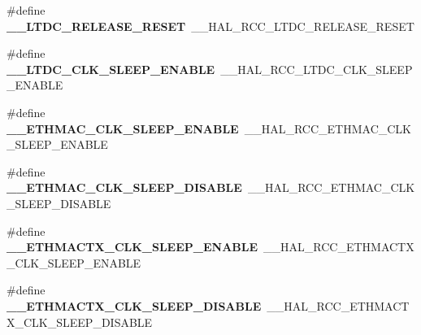 \begin{DoxyCompactItemize}
\item 
\hypertarget{group___h_a_l___r_c_c___aliased_ga481cafca3c88f7c7da318f9a6ab50cdb}{\#define {\bfseries \-\_\-\-\_\-\-L\-T\-D\-C\-\_\-\-R\-E\-L\-E\-A\-S\-E\-\_\-\-R\-E\-S\-E\-T}~\-\_\-\-\_\-\-H\-A\-L\-\_\-\-R\-C\-C\-\_\-\-L\-T\-D\-C\-\_\-\-R\-E\-L\-E\-A\-S\-E\-\_\-\-R\-E\-S\-E\-T}\label{group___h_a_l___r_c_c___aliased_ga481cafca3c88f7c7da318f9a6ab50cdb}

\item 
\hypertarget{group___h_a_l___r_c_c___aliased_ga3f970fe5172ef41349997acb72e5b92c}{\#define {\bfseries \-\_\-\-\_\-\-L\-T\-D\-C\-\_\-\-C\-L\-K\-\_\-\-S\-L\-E\-E\-P\-\_\-\-E\-N\-A\-B\-L\-E}~\-\_\-\-\_\-\-H\-A\-L\-\_\-\-R\-C\-C\-\_\-\-L\-T\-D\-C\-\_\-\-C\-L\-K\-\_\-\-S\-L\-E\-E\-P\-\_\-\-E\-N\-A\-B\-L\-E}\label{group___h_a_l___r_c_c___aliased_ga3f970fe5172ef41349997acb72e5b92c}

\item 
\hypertarget{group___h_a_l___r_c_c___aliased_ga719cdae441aa9421f0714b6359d02375}{\#define {\bfseries \-\_\-\-\_\-\-E\-T\-H\-M\-A\-C\-\_\-\-C\-L\-K\-\_\-\-S\-L\-E\-E\-P\-\_\-\-E\-N\-A\-B\-L\-E}~\-\_\-\-\_\-\-H\-A\-L\-\_\-\-R\-C\-C\-\_\-\-E\-T\-H\-M\-A\-C\-\_\-\-C\-L\-K\-\_\-\-S\-L\-E\-E\-P\-\_\-\-E\-N\-A\-B\-L\-E}\label{group___h_a_l___r_c_c___aliased_ga719cdae441aa9421f0714b6359d02375}

\item 
\hypertarget{group___h_a_l___r_c_c___aliased_gac126a734a698ab6ea80dc14acb166bcc}{\#define {\bfseries \-\_\-\-\_\-\-E\-T\-H\-M\-A\-C\-\_\-\-C\-L\-K\-\_\-\-S\-L\-E\-E\-P\-\_\-\-D\-I\-S\-A\-B\-L\-E}~\-\_\-\-\_\-\-H\-A\-L\-\_\-\-R\-C\-C\-\_\-\-E\-T\-H\-M\-A\-C\-\_\-\-C\-L\-K\-\_\-\-S\-L\-E\-E\-P\-\_\-\-D\-I\-S\-A\-B\-L\-E}\label{group___h_a_l___r_c_c___aliased_gac126a734a698ab6ea80dc14acb166bcc}

\item 
\hypertarget{group___h_a_l___r_c_c___aliased_ga821804d4757084a396a5737683660e0c}{\#define {\bfseries \-\_\-\-\_\-\-E\-T\-H\-M\-A\-C\-T\-X\-\_\-\-C\-L\-K\-\_\-\-S\-L\-E\-E\-P\-\_\-\-E\-N\-A\-B\-L\-E}~\-\_\-\-\_\-\-H\-A\-L\-\_\-\-R\-C\-C\-\_\-\-E\-T\-H\-M\-A\-C\-T\-X\-\_\-\-C\-L\-K\-\_\-\-S\-L\-E\-E\-P\-\_\-\-E\-N\-A\-B\-L\-E}\label{group___h_a_l___r_c_c___aliased_ga821804d4757084a396a5737683660e0c}

\item 
\hypertarget{group___h_a_l___r_c_c___aliased_ga2965f3df04e318e630a14190539ed94f}{\#define {\bfseries \-\_\-\-\_\-\-E\-T\-H\-M\-A\-C\-T\-X\-\_\-\-C\-L\-K\-\_\-\-S\-L\-E\-E\-P\-\_\-\-D\-I\-S\-A\-B\-L\-E}~\-\_\-\-\_\-\-H\-A\-L\-\_\-\-R\-C\-C\-\_\-\-E\-T\-H\-M\-A\-C\-T\-X\-\_\-\-C\-L\-K\-\_\-\-S\-L\-E\-E\-P\-\_\-\-D\-I\-S\-A\-B\-L\-E}\label{group___h_a_l___r_c_c___aliased_ga2965f3df04e318e630a14190539ed94f}


\end{DoxyCompactItemize}

